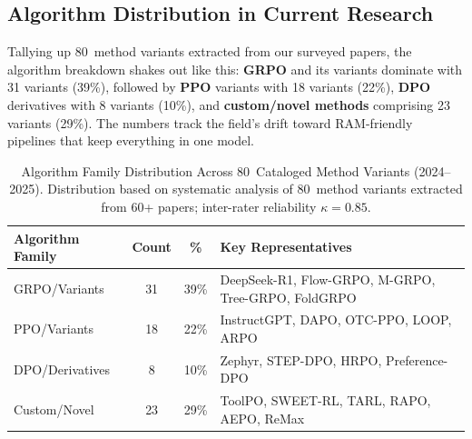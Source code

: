 \documentclass[12pt,a4paper]{report}
\theoremstyle{definition}
\newcommand{\methodN}{80}
\begin{document}
\subsection{Algorithm Distribution in Current Research}
Tallying up \methodN\ method variants extracted from our surveyed papers, the algorithm breakdown shakes out like this: \textbf{GRPO} and its variants dominate with 31 variants (39\%), followed by \textbf{PPO} variants with 18 variants (22\%), \textbf{DPO} derivatives with 8 variants (10\%), and \textbf{custom/novel methods} comprising 23 variants (29\%). The numbers track the field's drift toward RAM-friendly pipelines that keep everything in one model.

\begin{table}[h]
\centering
\caption{Algorithm Family Distribution Across \methodN\ Cataloged Method Variants (2024--2025). Distribution based on systematic analysis of \methodN\ method variants extracted from 60+ papers; inter-rater reliability $\kappa=0.85$.\protect\footnotemark}
\label{tab:algorithm_distribution}
\small
\begin{tabularx}{\textwidth}{@{}lcc>{\raggedright\arraybackslash}X@{}}
\toprule
\textbf{Algorithm Family} & \textbf{Count} & \textbf{\%} & \textbf{Key Representatives} \\
\midrule
GRPO/Variants & 31 & 39\% & DeepSeek-R1, Flow-GRPO, M-GRPO, Tree-GRPO, FoldGRPO \\
PPO/Variants & 18 & 22\% & InstructGPT, DAPO, OTC-PPO, LOOP, ARPO \\
DPO/Derivatives & 8 & 10\% & Zephyr, STEP-DPO, HRPO, Preference-DPO \\
Custom/Novel & 23 & 29\% & ToolPO, SWEET-RL, TARL, RAPO, AEPO, ReMax \\
\bottomrule
\end{tabularx}
\end{table}
\end{document}
